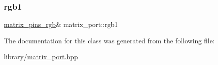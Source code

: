 \mbox{\label{classmatrix__port_a0c76660c065e0c329c723d02973d0c20}} 
\subsubsection{\texorpdfstring{rgb1}{rgb1}}
{\footnotesize\ttfamily \hyperlink{classmatrix__pins__rgb}{matrix\+\_\+pins\+\_\+rgb}\& matrix\+\_\+port\+::rgb1}



The documentation for this class was generated from the following file\+:\begin{DoxyCompactItemize}
\item 
library/\hyperlink{matrix__port_8hpp}{matrix\+\_\+port.\+hpp}\end{DoxyCompactItemize}
